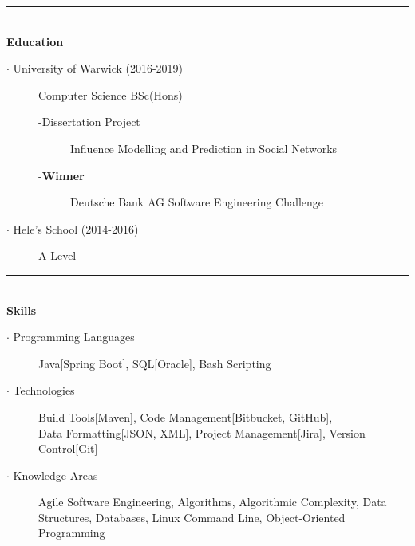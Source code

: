 \documentclass[12pt, a4paper]{article}
\begin{document}
    \noindent\rule{8cm}{0.4pt} \\
    \textbf{Education}
    \begin{description}
        \item[$\cdot$ University of Warwick (2016-2019)] Computer Science BSc(Hons)
        \begin{description}
            \item[-Dissertation Project] Influence Modelling and Prediction in Social Networks
            \item[-\textbf{Winner}] Deutsche Bank AG Software Engineering Challenge
        \end{description}
        \item[$\cdot$ Hele's School (2014-2016)] A Level
    \end{description}

    \vspace{-2ex}
    \noindent\rule{8cm}{0.4pt} \\
    \textbf{Skills}
    \begin{description}
        \item[$\cdot$ Programming Languages]  Java[Spring Boot],
        SQL[Oracle],
        Bash Scripting
        \item[$\cdot$ Technologies] Build Tools[Maven],
        Code Management[Bitbucket, GitHub],
        \\Data Formatting[JSON, XML],
        Project Management[Jira],
        Version Control[Git]
        \item[$\cdot$ Knowledge Areas] Agile Software Engineering,
        Algorithms,
        Algorithmic Complexity,
        Data Structures,
        Databases,
        Linux Command Line,
        Object-Oriented Programming

    \end{description}
\end{document}
